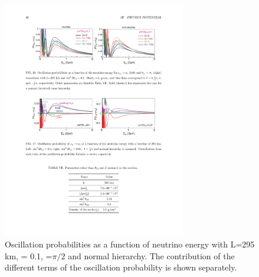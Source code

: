 \begin{figure} [htbp!]
\begin{center}
\includegraphics[width=8cm]{figures/papp_prob_2.pdf}
\caption{\label{fig:t2kappprob} Oscillation probabilities as a function of neutrino energy with L=295 km, \stot = 0.1, \dcp=$\pi/2$ and normal hierarchy. The contribution of the different terms of the oscillation probability is shown separately.}
\end{center}
\end{figure}



%

